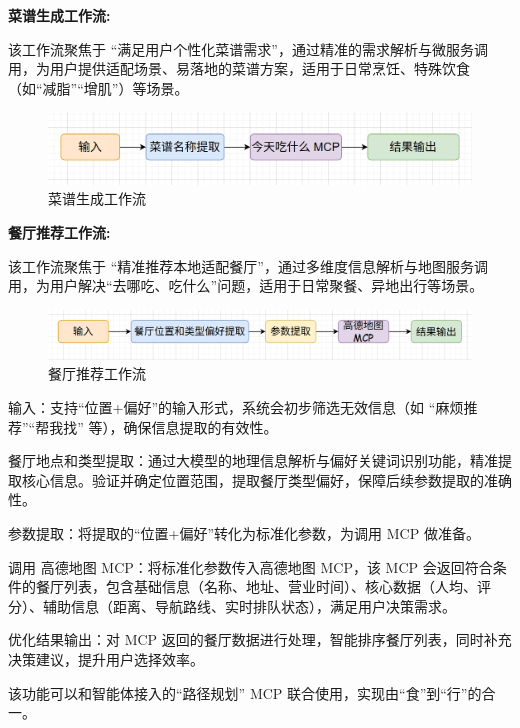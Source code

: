 \documentclass[a4paper,UTF8]{ctexart}
\begin{document}
{\bfseries 菜谱生成工作流:}
\par
该工作流聚焦于 “满足用户个性化菜谱需求”，通过精准的需求解析与微服务调用，为用户提供适配场景、易落地的菜谱方案，适用于日常烹饪、特殊饮食（如“减脂”“增肌”）等场景。​
\begin{figure}[H]
    \centering
    \includegraphics[width=0.8\linewidth]{0-2.png}
    \caption{菜谱生成工作流}
    \label{fig:diet_recommend}
\end{figure}
\vspace*{0.8cm}

{\bfseries 餐厅推荐工作流:}
\par
该工作流聚焦于 “精准推荐本地适配餐厅”，通过多维度信息解析与地图服务调用，为用户解决“去哪吃、吃什么”问题，适用于日常聚餐、异地出行等场景。​
\begin{figure}[H]
    \centering
    \includegraphics[width=0.8\linewidth]{0-3.png}
    \caption{餐厅推荐工作流}
    \label{fig:diet_recommend}
\end{figure}
输入：支持“位置+偏好”的输入形式，系统会初步筛选无效信息（如 “麻烦推荐”“帮我找” 等），确保信息提取的有效性。
\par
餐厅地点和类型提取：通过大模型的地理信息解析与偏好关键词识别功能，精准提取核心信息。验证并确定位置范围，提取餐厅类型偏好，保障后续参数提取的准确性。
\par
参数提取：将提取的“位置+偏好”转化为标准化参数，为调用 MCP 做准备。
\par
调用 高德地图 MCP：将标准化参数传入高德地图 MCP，该 MCP 会返回符合条件的餐厅列表，包含基础信息（名称、地址、营业时间）、核心数据（人均、评分）、辅助信息（距离、导航路线、实时排队状态），满足用户决策需求。
\par
优化结果输出：对 MCP 返回的餐厅数据进行处理，智能排序餐厅列表，同时补充决策建议，提升用户选择效率。
\par
该功能可以和智能体接入的“路径规划” MCP 联合使用，实现由“食”到“行”的合一。
\end{document}
